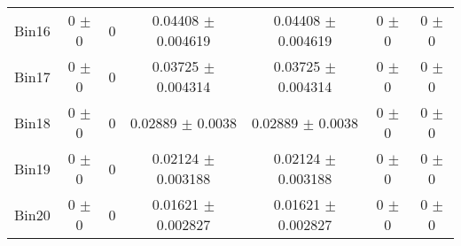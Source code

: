 \begin{tabular}{@{\extracolsep{4pt}}lcccccc@{}}
     Bin16 & 0 $\pm$ 0 & 0 & 0.04408 $\pm$ 0.004619 & 0.04408 $\pm$ 0.004619 & 0 $\pm$ 0 & 0 $\pm$ 0 \\ 
     Bin17 & 0 $\pm$ 0 & 0 & 0.03725 $\pm$ 0.004314 & 0.03725 $\pm$ 0.004314 & 0 $\pm$ 0 & 0 $\pm$ 0 \\ 
     Bin18 & 0 $\pm$ 0 & 0 & 0.02889 $\pm$ 0.0038 & 0.02889 $\pm$ 0.0038 & 0 $\pm$ 0 & 0 $\pm$ 0 \\ 
     Bin19 & 0 $\pm$ 0 & 0 & 0.02124 $\pm$ 0.003188 & 0.02124 $\pm$ 0.003188 & 0 $\pm$ 0 & 0 $\pm$ 0 \\ 
     Bin20 & 0 $\pm$ 0 & 0 & 0.01621 $\pm$ 0.002827 & 0.01621 $\pm$ 0.002827 & 0 $\pm$ 0 & 0 $\pm$ 0 \\ 
\hline\hline
  \end{tabular}
